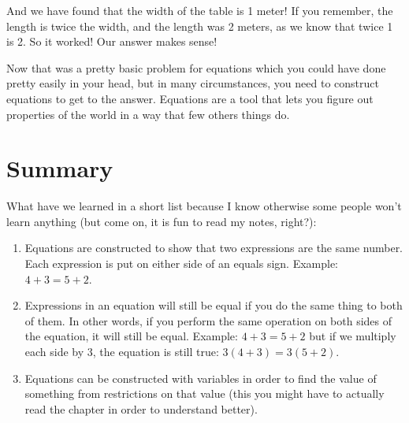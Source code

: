 \documentclass{article}
\begin{document}
And we have found that the width of the table is 1 meter! If you remember, the length is twice the width, and the length was 2 meters, as we know that twice 1 is 2. So it worked! Our answer makes sense!

Now that was a pretty basic problem for equations which you could have done pretty easily in your head, but in many circumstances, you need to construct equations to get to the answer. Equations are a tool that lets you figure out properties of the world in a way that few others things do. 

\section*{Summary}
What have we learned in a short list because I know otherwise some people won't learn anything (but come on, it is fun to read my notes, right?): 
\begin{enumerate}
    \item Equations are constructed to show that two expressions are the same number. Each expression is put on either side of an equals sign. Example: $4+3 = 5+2$. 
    \item Expressions in an equation will still be equal if you do the same thing to both of them. In other words, if you perform the same operation on both sides of the equation, it will still be equal. Example: $4+3 = 5+2$ but if we multiply each side by 3, the equation is still true: $3(4+3) = 3(5+2)$.
    \item Equations can be constructed with variables in order to find the value of something from restrictions on that value (this you might have to actually read the chapter in order to understand better). 
\end{enumerate}

\newpage
\end{document}
